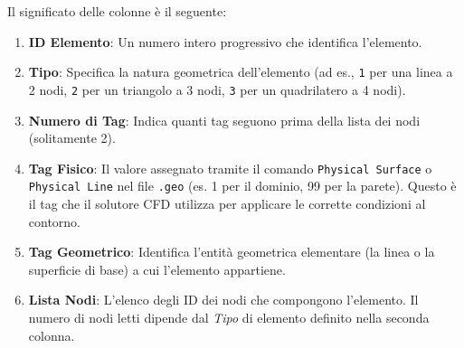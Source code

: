 Il significato delle colonne è il seguente:
\begin{enumerate}
  \item \textbf{ID Elemento}: Un numero intero progressivo che identifica l'elemento.
  \item \textbf{Tipo}: Specifica la natura geometrica dell'elemento (ad es., \texttt{1} per una linea a 2 nodi, \texttt{2} per un triangolo a 3 nodi, \texttt{3} per un quadrilatero a 4 nodi).
  \item \textbf{Numero di Tag}: Indica quanti tag seguono prima della lista dei nodi (solitamente 2).
  \item \textbf{Tag Fisico}: Il valore assegnato tramite il comando \texttt{Physical Surface} o \texttt{Physical Line} nel file \texttt{.geo} (es. 1 per il dominio, 99 per la parete). Questo è il tag che il solutore CFD utilizza per applicare le corrette condizioni al contorno.
  \item \textbf{Tag Geometrico}: Identifica l'entità geometrica elementare (la linea o la superficie di base) a cui l'elemento appartiene.
  \item \textbf{Lista Nodi}: L'elenco degli ID dei nodi che compongono l'elemento. Il numero di nodi letti dipende dal \emph{Tipo} di elemento definito nella seconda colonna.
\end{enumerate}
